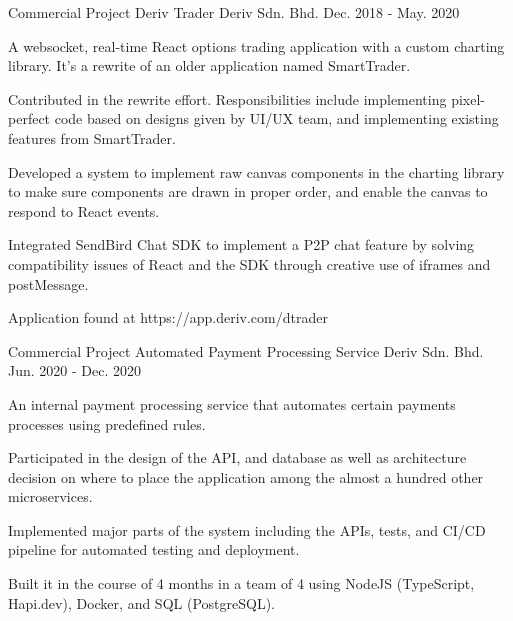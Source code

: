 \pagebreak


\begin{cventries}

  \cventry
    {Commercial Project} %
    {Deriv Trader} %
    {Deriv Sdn. Bhd.} %
    {Dec. 2018 - May. 2020} %
    {
      \begin{cvitems} %
        \item {A websocket, real-time React options trading application with a custom charting library. It's a rewrite of an older application named SmartTrader.}
        \item {Contributed in the rewrite effort. Responsibilities include implementing pixel-perfect code based on designs given by UI/UX team, and implementing existing features from SmartTrader.}
        \item {Developed a system to implement raw canvas components in the charting library to make sure components are drawn in proper order, and enable the canvas to respond to React events.}
        \item {Integrated SendBird Chat SDK to implement a P2P chat feature by solving compatibility issues of React and the SDK through creative use of iframes and postMessage. }
        \item {Application found at https://app.deriv.com/dtrader}
      \end{cvitems}
    }

  \cventry
    {Commercial Project} %
    {Automated Payment Processing Service} %
    {Deriv Sdn. Bhd.} %
    {Jun. 2020 - Dec. 2020} %
    {
      \begin{cvitems} %
        \item {An internal payment processing service that automates certain payments processes using predefined rules.}
        \item {Participated in the design of the API, and database as well as architecture decision on where to place the application among the almost a hundred other microservices.}
        \item {Implemented major parts of the system including the APIs, tests, and CI/CD pipeline for automated testing and deployment.}
        \item {Built it in the course of 4 months in a team of 4 using NodeJS (TypeScript, Hapi.dev), Docker, and SQL (PostgreSQL).}
      \end{cvitems}
    }

\end{cventries}